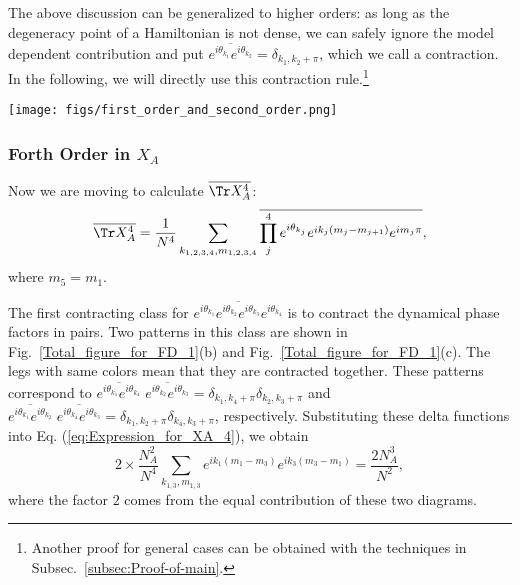 The above discussion can be generalized to higher orders: as long
as the degeneracy point of a Hamiltonian is not dense, we can safely
ignore the model dependent contribution %
and put $\overline{e^{i\theta_{k_{1}}}e^{i\theta_{k_{2}}}}=\delta_{k_{1},k_{2}+\pi}$,
which we call %
a contraction. In the following, %
we will directly
use this contraction rule.\footnote{Another proof for general cases can be obtained with the techniques in Subsec.~\ref{subsec:Proof-of-main}.}


\begin{figure*}
\texttt{[image: figs/first\_order\_and\_second\_order.png]}
\caption{%
Feynman diagrams for calculating the entanglement entropy order by order. Here each
vertex represents a position index and each leg represents a momentum
index. Each leg is associated with $%
e^{i\theta_{k}}e^{ik(m-m')}e^{i\pi m'}$.
In these diagrams, the legs with same color need to be contracted.
Each color corresponds to one contraction.}
\label{Total_figure_for_FD_1}
\end{figure*}


\subsubsection{Forth Order in $X_{A}$}

Now we are moving to calculate $\overline{\Tr X_{A}^{4}}$:
\begin{equation}
\overline{\Tr X_{A}^{4}}=\frac{1}{N^{4}}\sum_{k_{1,2,3,4},m_{1,2,3,4}}\overline{\prod_{j}^{4}e^{i\theta_{k_{j}}}e^{ik_{j}(m_{j}-m_{j+1})}e^{im_{j}\pi}},
\label{eq:Expression_for_XA_4}
\end{equation}
where $m_{5}=m_{1}$. 

The first contracting class for $\overline{e^{i\theta_{k_{1}}}e^{i\theta_{k_{2}}}e^{i\theta_{k_{3}}}e^{i\theta_{k_{4}}}}$
is to contract the dynamical phase factors in pairs. %
Two patterns in this class are shown
in Fig.~\ref{Total_figure_for_FD_1}(b) and Fig.~\ref{Total_figure_for_FD_1}(c).
The legs with same colors mean that they are contracted together.
These patterns correspond to $\overline{e^{i\theta_{k_{1}}}e^{i\theta_{k_{4}}}}\;\overline{e^{i\theta_{k_{2}}}e^{i\theta_{k_{3}}}}=\delta_{k_{1},k_{4}+\pi}\delta_{k_{2},k_{3}+\pi}$
and $\overline{e^{i\theta_{k_{1}}}e^{i\theta_{k_{2}}}}\;\overline{e^{i\theta_{k_{4}}}e^{i\theta_{k_{3}}}}=\delta_{k_{1},k_{2}+\pi}\delta_{k_{4},k_{3}+\pi}$,
respectively. Substituting these delta functions into Eq. (\ref{eq:Expression_for_XA_4}),
we obtain 
\begin{equation}
2\times\frac{N_{A}^{2}}{N^{4}}\sum_{k_{1,3},m_{1,3}}e^{ik_{1}(m_{1}-m_{3})}e^{ik_{3}(m_{3}-m_{1})}=\frac{2N_{A}^{3}}{N^{2}},
\end{equation}
where the factor $2$ comes from the equal contribution of these two diagrams. 


